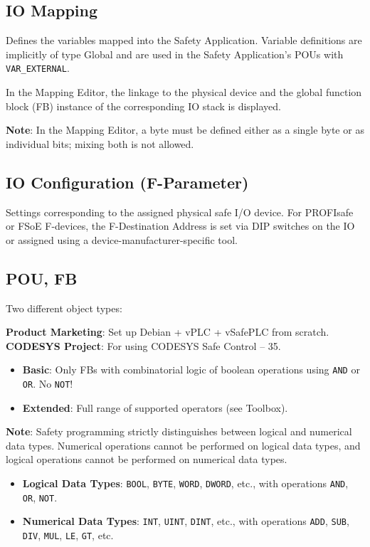 \documentclass[a4paper,12pt]{article}
\begin{document}
\subsection{IO Mapping}
Defines the variables mapped into the Safety Application. Variable definitions are implicitly of type Global and are used in the Safety Application's POUs with \texttt{VAR\_EXTERNAL}. 

In the Mapping Editor, the linkage to the physical device and the global function block (FB) instance of the corresponding IO stack is displayed.

\textbf{Note}: In the Mapping Editor, a byte must be defined either as a single byte or as individual bits; mixing both is not allowed.

\subsection{IO Configuration (F-Parameter)}
Settings corresponding to the assigned physical safe I/O device. For PROFIsafe or FSoE F-devices, the F-Destination Address is set via DIP switches on the IO or assigned using a device-manufacturer-specific tool.

\subsection{POU, FB}
Two different object types:

\textbf{Product Marketing}: Set up Debian + vPLC + vSafePLC from scratch. \\
\textbf{CODESYS Project}: For using CODESYS Safe Control – 35.

\begin{itemize}
	\item \textbf{Basic}: Only FBs with combinatorial logic of boolean operations using \texttt{AND} or \texttt{OR}. No \texttt{NOT}!
	\item \textbf{Extended}: Full range of supported operators (see Toolbox).
\end{itemize}

\textbf{Note}: Safety programming strictly distinguishes between logical and numerical data types. Numerical operations cannot be performed on logical data types, and logical operations cannot be performed on numerical data types.

\begin{itemize}
	\item \textbf{Logical Data Types}: \texttt{BOOL}, \texttt{BYTE}, \texttt{WORD}, \texttt{DWORD}, etc., with operations \texttt{AND}, \texttt{OR}, \texttt{NOT}.
	\item \textbf{Numerical Data Types}: \texttt{INT}, \texttt{UINT}, \texttt{DINT}, etc., with operations \texttt{ADD}, \texttt{SUB}, \texttt{DIV}, \texttt{MUL}, \texttt{LE}, \texttt{GT}, etc.
\end{itemize}
\end{document}
